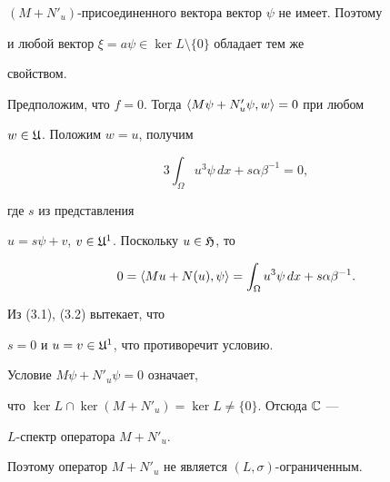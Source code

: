 \begin{pf}
$(M+N'_{u})$-при\-со\-е\-ди\-нен\-ного вектора вектор $\psi$ не имеет. Поэтому


и любой вектор $\xi=a\psi\in\ker L\setminus\{0\}$ обладает тем же


свойством.





Предположим, что $f=0$. Тогда $\langle M\psi+N'_u\psi,w\rangle=0$ при любом


$w\in\frak U$. Положим $w=u$, получим 


\begin{equation} 


3\int_\Omega u^3\psi \,dx+s\alpha\beta^{-1}=0,


\end{equation}


где $s$ из представления


$u=s\psi+v$, $v\in\frak U^{1}$. Поскольку $u\in\frak H$, то


\begin{equation}


0=\la Mu+N(u),\psi\ra=\int_{\Omega}u^{3}\psi\,


dx+s\alpha\beta^{-1}.


\end{equation}


Из (3.1), (3.2) вытекает, что


$s=0$ и $u=v\in\frak U^{1}$, что противоречит условию.


\end{pf}





Условие $M\psi+N'_{u}\psi=0$ означает,


что $\ker L\cap\ker(M+N'_{u})=\ker L\ne\{0\}$. Отсюда $\Bbb C$ ---


\mbox{$L$-спектр} оператора $M+N'_{u}$.


Поэтому оператор $M+N'_{u}$ не является $(L,\sigma)$-ограниченным.








